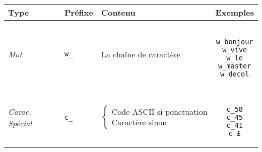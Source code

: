 \begin{tabular}{|l|l|l|c|}
\hline
\textbf{Type} & \textbf{Préfixe} & \textbf{Contenu} & \textbf{Exemples} \\
\hline
\textit{Mot} & \verb+w_+ & La chaîne de caractère & \begin{minipage}{2cm}
\begin{verbatim}

w_bonjour
w_vive
w_le
w_master
w_decol

\end{verbatim}
\end{minipage} \\
\hline
\textit{Carac. Spécial} & \verb+c_+ & \begin{minipage}{4.5cm}\begin{displaymath}\begin{cases}
      \textrm{Code ASCII si ponctuation} \\
      \textrm{Caractère sinon}
\end{cases}
\end{displaymath} 
\end{minipage} & \begin{minipage}{2cm}
\begin{verbatim}

c_58
c_45
c_41
c_£

\end{verbatim}
\end{minipage} \\
\hline
\end{tabular}